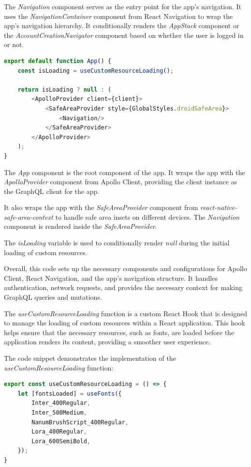 The \textit{Navigation} component serves as the entry point for the app's navigation. It uses the \textit{NavigationContainer} component from React Navigation to wrap the app's navigation hierarchy. It conditionally renders the \textit{AppStack} component or the \textit{AccountCreationNavigator} component based on whether the user is logged in or not.

\begin{lstlisting}[language=TypeScript]
export default function App() {
    const isLoading = useCustomResourceLoading();

    return isLoading ? null : (
        <ApolloProvider client={client}>
            <SafeAreaProvider style={GlobalStyles.droidSafeArea}>
                <Navigation/>
            </SafeAreaProvider>
        </ApolloProvider>
    );
}
\end{lstlisting}

The \textit{App} component is the root component of the app. It wraps the app with the \textit{ApolloProvider} component from Apollo Client, providing the client instance as the GraphQL client for the app.

It also wraps the app with the \textit{SafeAreaProvider} component from \textit{react-native-safe-area-context} to handle safe area insets on different devices. The \textit{Navigation} component is rendered inside the \textit{SafeAreaProvider}.

The \textit{isLoading} variable is used to conditionally render \textit{null} during the initial loading of custom resources.

Overall, this code sets up the necessary components and configurations for Apollo Client, React Navigation, and the app's navigation structure. It handles authentication, network requests, and provides the necessary context for making GraphQL queries and mutations.

The \textit{useCustomResourceLoading} function is a custom React Hook that is designed to manage the loading of custom resources within a React application. This hook helps ensure that the necessary resources, such as fonts, are loaded before the application renders its content, providing a smoother user experience.

The code snippet demonstrates the implementation of the \textit{useCustomResourceLoading} function:

\begin{lstlisting}[language=TypeScript]
export const useCustomResourceLoading = () => {
    let [fontsLoaded] = useFonts({
        Inter_400Regular,
        Inter_500Medium,
        NanumBrushScript_400Regular,
        Lora_400Regular,
        Lora_600SemiBold,
    });
}
\end{lstlisting}

